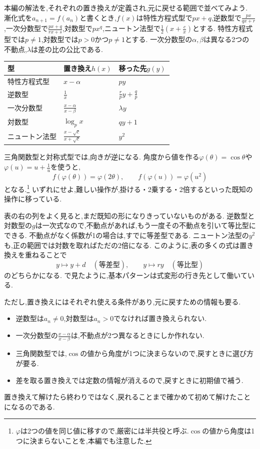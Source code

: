 本編の解法を,それぞれの置き換えが定義され,元に戻せる範囲で並べてみよう.
漸化式を$a_{n+1}=f(a_n)$と書くとき,$f(x)$は特性方程式型で$px+q$,逆数型で$\frac{px}{qx+r}$,一次分数型で$\frac{px+q}{rx+s}$,対数型で$px^q$,ニュートン法型で$\frac12\left(x+\frac cx\right)$とする.
特性方程式型では$p\ne1$,対数型では$p>0$かつ$p\ne1$とする.
一次分数型の$\alpha,\beta$は異なる2つの不動点,$\lambda$は差の比の公比である.
\begin{center}
  \renewcommand{\arraystretch}{1.6}
  \begin{tabular}{l|l|l}
    型&置き換え$h(x)$&移った先$g(y)$\\ \hline
    特性方程式型&$x-\alpha$&$py$\\
    逆数型&$\frac1x$&$\frac rpy+\frac qp$\\
    一次分数型&$\frac{x-\alpha}{x-\beta}$&$\lambda y$\\
    対数型&$\log_px$&$qy+1$\\
    ニュートン法型&$\frac{x-\sqrt c}{x+\sqrt c}$&$y^2$
  \end{tabular}
\end{center}
三角関数型と対称式型では,向きが逆になる.
角度から値を作る$\varphi(\theta)=\cos\theta$や$\varphi(u)=u+\frac1u$を使うと,
\[
  f(\varphi(\theta))=\varphi(2\theta),\qquad f(\varphi(u))=\varphi(u^2)
\]
となる.\footnote{$\varphi$は2つの値を同じ値に移すので,厳密には半共役と呼ぶ.$\cos$の値から角度は1つに決まらないことを,本編でも注意した.}
いずれにせよ,難しい操作が,掛ける・2乗する・2倍するといった既知の操作に移っている.

表の右の列をよく見ると,まだ既知の形になりきっていないものがある.
逆数型と対数型の$g$は一次式なので,不動点があれば,もう一度その不動点を引いて等比型にできる.
不動点がなく係数が1の場合は,すでに等差型である.
ニュートン法型の$y^2$も,正の範囲では対数を取ればただの2倍になる.
このように,表の多くの式は置き換えを重ねることで
\[
  y\mapsto y+d\quad(\text{等差型}),\qquad y\mapsto ry\quad(\text{等比型})
\]
のどちらかになる.
で見たように,基本パターンは式変形の行き先として働いている.

ただし,置き換えにはそれぞれ使える条件があり,元に戻すための情報も要る.
\begin{itemize}
  \item 逆数型は$a_n\ne0$,対数型は$a_n>0$でなければ置き換えられない.
  \item 一次分数型の$\frac{x-\alpha}{x-\beta}$は,不動点が2つ異なるときにしか作れない.
  \item 三角関数型では,$\cos$の値から角度が1つに決まらないので,戻すときに選び方が要る.
  \item 差を取る置き換えでは定数の情報が消えるので,戻すときに初期値で補う.
\end{itemize}
置き換えて解けたら終わりではなく,戻れることまで確かめて初めて解けたことになるのである.

